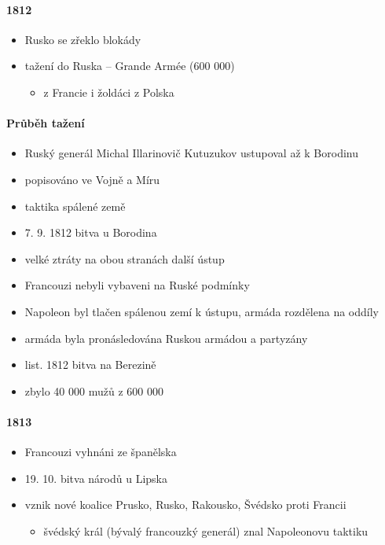 \paragraph{1812}
\begin{itemize}
\item Rusko se zřeklo blokády
\item[\ra] tažení do Ruska -- Grande Armée (600 000)
	\begin{itemize}
	\item z Francie i žoldáci z Polska
	\end{itemize}
\end{itemize}

\paragraph{Průběh tažení}
\begin{itemize}
\item Ruský generál Michal Illarinovič Kutuzukov ustupoval až k Borodinu
\item popisováno ve Vojně a Míru
\item taktika spálené země 
\item 7. 9. 1812 bitva u Borodina
\item velké ztráty na obou stranách \ra další ústup
\item Francouzi nebyli vybaveni na Ruské podmínky
\item Napoleon byl tlačen spálenou zemí k ústupu, armáda rozdělena na oddíly
\item armáda byla pronásledována Ruskou armádou a partyzány
\item list. 1812 bitva na Berezině 
\item zbylo 40 000 mužů z 600 000
\end{itemize}

\paragraph{1813}
\begin{itemize}
\item Francouzi vyhnáni ze španělska
\item 19. 10. bitva národů u Lipska
\item vznik nové koalice Prusko, Rusko, Rakousko, Švédsko proti Francii
	\begin{itemize}
	\item švédský král (bývalý francouzký generál) znal Napoleonovu taktiku
	\end{itemize}
\end{itemize}

